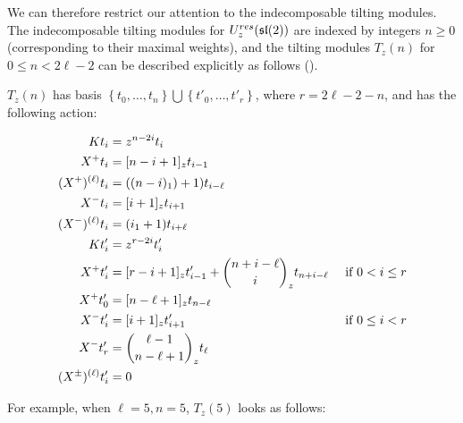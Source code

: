 We can therefore restrict our attention to the indecomposable tilting modules.
The indecomposable tilting modules for $U_z^{res}(\mathfrak{sl}(2))$ are indexed by integers $n
\geq 0$ (corresponding to their maximal weights), and the tilting modules
$T_z(n)$ for $0 \leq n < 2\ell - 2$ can be described explicitly as follows
(\cite{CP}). 

$T_z(n)$ has basis $\left\{ t_0, \ldots, t_n \right\} \bigcup \left\{ t'_0,
    \ldots, t'_{r} \right\}$, where $r = 2\ell - 2 - n$, and has the following
    action:

\begin{align}
    Kt_i &= z^{n-2i} t_i \\
    X^+ t_i &= [n-i+1]_z t_{i-1} \\
    (X^+)^{(\ell)} t_i &= ((n-i)_1) + 1) t_{i-\ell} \\
    X^-t_i &= [i+1]_z t_{i+1} \\
    (X^-)^{(\ell)} t_i &= (i_1 + 1) t_{i+\ell} \\
    Kt'_i &= z^{r-2i} t'_i \\
    X^+ t'_i &= [r-i+1]_z t'_{i-1}  + \dbinom{n + i - \ell}{i}_z t_{n+i-\ell} &\text{ if $0 < i \leq r$}\\
    X^+ t'_0 &= [n - \ell + 1]_z t_{n-\ell} \\
    X^-t'_i &= [i+1]_z t'_{i+1} &\text{ if $0 \leq i < r$}\\
    X^- t'_r &= \dbinom{\ell - 1}{n - \ell + 1}_z t_\ell \\
    (X^\pm)^{(\ell)} t'_i  &= 0
\end{align}

For example, when $\ell = 5, n = 5$, $T_z(5)$ looks as follows:

